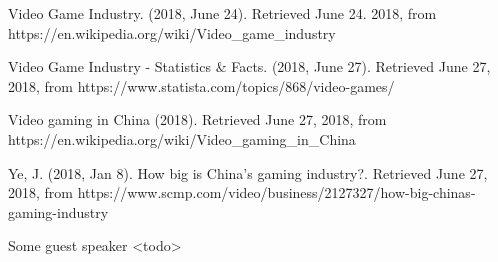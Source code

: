 \documentclass[10pt,letterpaper]{article}
\begin{document}
\begin{thebibliography}{}
	Video Game Industry. (2018, June 24). Retrieved June 24. 2018, from https://en.wikipedia.org/wiki/Video\_game\_industry

	Video Game Industry - Statistics \& Facts. (2018, June 27). Retrieved June 27, 2018, from https://www.statista.com/topics/868/video-games/

	Video gaming in China (2018). Retrieved June 27, 2018, from https://en.wikipedia.org/wiki/Video\_gaming\_in\_China

	Ye, J. (2018, Jan 8). How big is China's gaming industry?. Retrieved June 27, 2018, from https://www.scmp.com/video/business/2127327/how-big-chinas-gaming-industry

	Some guest speaker <todo>

\end{thebibliography}
\end{document}
